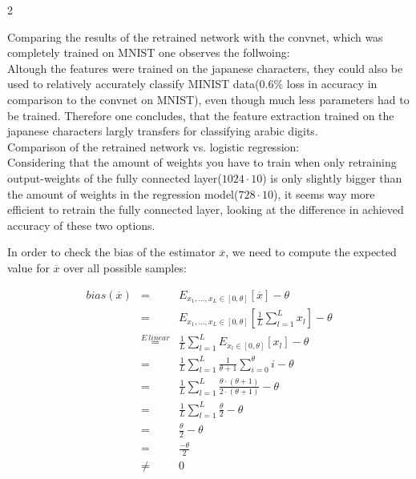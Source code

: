 \documentclass{article}
\begin{document}
\begin{ukon-infie}[3.12.17]{2}
\begin{exercise}[p=20]{}
{Comparing the results of the retrained network with the convnet, which was completely trained on MNIST one observes the follwoing:\\
Altough the features were trained on the japanese characters, they could also be used to relatively accurately classify MINIST data(0.6\% loss in accuracy in comparison to the convnet on MNIST), even though much less parameters had to be trained. Therefore one concludes, that the feature extraction trained on the japanese characters largly transfers for classifying arabic digits.\\

Comparison of the retrained network vs. logistic regression:\\
Considering that the amount of weights you have to train when only retraining output-weights of the fully connected layer($1024 \cdot 10$) is only slightly bigger than the amount of weights in the regression model($728 \cdot 10$), it seems way more efficient to retrain the fully connected layer, looking at the difference in achieved accuracy of these two options.\\		}
		\end{exercise}
		\begin{exercise}[p=20]{}
		
		\end{exercise}
		\begin{exercise}[p=20]{}
		
		In order to check the bias of the estimator $\overline{x}$, we need to compute the expected value for $\overline{x}$ over all possible samples:\\
		
		\question{}
		{
		\begin{eqnarray*}
		bias(\overline{x}) 
		&=& E_{x_1, \dots, x_L \in [0, \theta]}[\overline{x}] - \theta \\
		&=& E_{x_1, \dots, x_L \in [0, \theta]}\left[\frac{1}{L}\sum_{l = 1}^L x_l\right] - \theta \\
		&\stackrel{E ~ linear}{=}& \frac{1}{L}\sum_{l = 1}^L E_{x_l \in [0, \theta]}[x_l] - \theta \\
		&=& \frac{1}{L}\sum_{l = 1}^L \frac{1}{\theta + 1}\sum_{i = 0}^{\theta} i - \theta \\
		&=& \frac{1}{L}\sum_{l = 1}^L \frac{\theta \cdot (\theta + 1)}{2 \cdot (\theta + 1)} - \theta \\
		&=& \frac{1}{L}\sum_{l = 1}^L \frac{\theta }{2} - \theta \\
		&=& \frac{\theta }{2} - \theta \\
		&=& \frac{-\theta }{2}\\
		&\not =& 0 \\
		\end{eqnarray*}
		
}
\end{exercise}
\end{ukon-infie}
\end{document}
